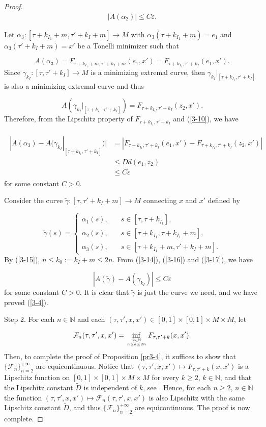 \documentclass{amsart}[12pt]
\theoremstyle{definition}
\theoremstyle{remark}
\numberwithin{equation}{section}
\begin{document}
\begin{proof}
\begin{align}\label{3-16}
|A(\alpha_2)|\leq C\varepsilon.
\end{align}

Let $\alpha_3:[\tau+k_{I_1}+m,\tau'+k_I+m]\to M$ with
$\alpha_3(\tau+k_{I_1}+m)=e_1$ and $\alpha_3(\tau'+k_I+m)=x'$ be a
Tonelli minimizer such that

\[
A(\alpha_3)=F_{\tau+k_{I_1}+m,\tau'+k_I+m}(e_1,x')=F_{\tau+k_{I_1},\tau'+k_I}(e_1,x').
\]
Since $\gamma_{k_I}:[\tau,\tau'+k_I]\to M$ is a minimizing
extremal curve, then $\gamma_{k_I}|_{[\tau+k_{I_1},\tau'+k_I]}$ is
also a minimizing extremal curve and thus

\[
A(\gamma_{k_I}|_{[\tau+k_{I_1},\tau'+k_I]})=F_{\tau+k_{I_1},\tau'+k_I}(z_2,x').
\]
Therefore, from the Lipschitz property of
$F_{\tau+k_{I_1},\tau'+k_I}$ and (\ref{3-10}), we have

\begin{align}\label{3-17}
\begin{split}
|A(\alpha_3)-A(\gamma_{k_I}|_{[\tau+k_{I_1},\tau'+k_I]})|
&=|F_{\tau+k_{I_1},\tau'+k_I}(e_1,x')-F_{\tau+k_{I_1},\tau'+k_I}(z_2,x')|\\
&\leq Dd(e_1,z_2)\\
&\leq C\varepsilon
\end{split}
\end{align}
for some constant $C>0$.

Consider the curve $\tilde{\gamma}:[\tau,\tau'+k_I+m]\to M$
connecting $x$ and $x'$ defined by

\[
\tilde{\gamma}(s)= \left\{\begin{array}{ll}
          \alpha_1(s),\quad & s\in[\tau,\tau+k_{I_1}],\\[2mm]
          \alpha_2(s),\quad & s\in[\tau+k_{I_1},\tau+k_{I_1}+m],\\[2mm]
          \alpha_3(s),\quad & s\in[\tau+k_{I_1}+m,\tau'+k_I+m].
\end{array}\right.
\]
By (\ref{3-15}), $n\leq k_0:=k_I+m\leq 2n$. From (\ref{3-14}),
(\ref{3-16}) and (\ref{3-17}), we have

\[
|A(\tilde{\gamma})-A(\gamma_{k_I})|\leq C\varepsilon
\]
for some constant $C>0$. It is clear that $\tilde{\gamma}$ is just
the curve we need, and we have proved (\ref{3-4}).

Step 2. For each $n\in\mathbb{N}$ and each
$(\tau,\tau',x,x')\in[0,1]\times[0,1]\times M\times M$, let

\[
\mathcal{F}_n(\tau,\tau',x,x')=\inf_{k\in\mathbb{N} \atop n\leq
k\leq 2n}F_{\tau,\tau'+k}(x,x').
\]
Then, to complete the proof of Proposition \ref{pr3-4}, it
suffices to show that $\{\mathcal{F}_n\}_{n=2}^{+\infty}$ are
equicontinuous. Notice that $(\tau,\tau',x,x')\mapsto
F_{\tau,\tau'+k}(x,x')$ is a Lipschitz function on
$[0,1]\times[0,1]\times M\times M$ for every $k\geq 2$,
$k\in\mathbb{N}$, and that the Lipschitz constant $\tilde{D}$ is
independent of $k$, see \cite[3.3 LEMMA]{Ber}. Hence, for each
$n\geq 2$, $n\in\mathbb{N}$ the function $(\tau,\tau',x,x')\mapsto
\mathcal{F}_n(\tau,\tau',x,x')$ is  also Lipschitz with the same
Lipschitz constant $\tilde{D}$, and thus
$\{\mathcal{F}_n\}_{n=2}^{+\infty}$ are equicontinuous. The proof
is now complete.


\end{proof}
\end{document}
